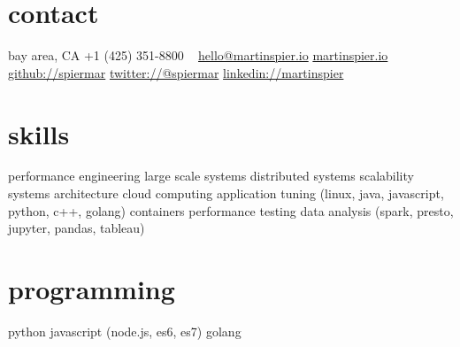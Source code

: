 \begin{aside}
    \section{contact}
        bay area, CA
        +1 (425) 351-8800
        ~
        \href{mailto:hello@martinspier.io}{hello@martinspier.io}
        \href{http://martinspier.io}{martinspier.io}
        \href{https://github.com/spiermar}{github://spiermar}
        \href{https://twitter.com/spiermar}{twitter://@spiermar}
        \href{https://www.linkedin.com/in/martinspier}{linkedin://martinspier}
    \section{skills}
        performance engineering
        large scale systems
        distributed systems
        scalability
        systems architecture
        cloud computing
        application tuning
        (linux, java, javascript, python, c++, golang)
        containers
        performance testing
        data analysis
        (spark, presto, jupyter, pandas, tableau)
        \section{programming}
        python
        javascript
        (node.js, es6, es7)
        golang
\end{aside}